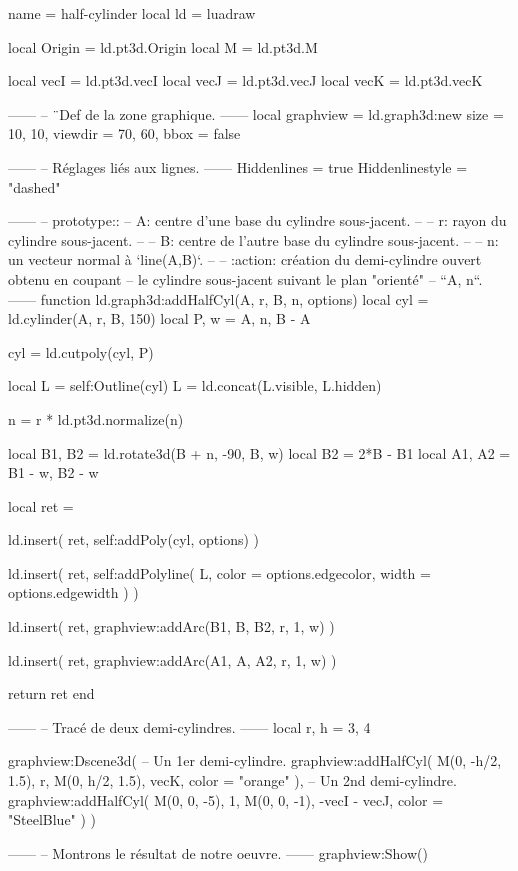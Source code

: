 \documentclass[border = 3pt]{standalone}
\begin{document}
\begin{luadraw*}{name = half-cylinder}
local ld = luadraw

local Origin = ld.pt3d.Origin
local M      = ld.pt3d.M

local vecI = ld.pt3d.vecI
local vecJ = ld.pt3d.vecJ
local vecK = ld.pt3d.vecK

------
-- ¨Def de la zone graphique.
------
local graphview = ld.graph3d:new{
  size    = {10, 10},
  viewdir = {70, 60},
  bbox    = false
}

------
-- Réglages liés aux lignes.
------
Hiddenlines     = true
Hiddenlinestyle = "dashed"

------
-- prototype::
--     A: centre d'une base du cylindre sous-jacent.
--
--     r: rayon du cylindre sous-jacent.
--
--     B: centre de l'autre base du cylindre sous-jacent.
--
--     n: un vecteur normal à `line(A,B)`.
--
--     :action: création du demi-cylindre ouvert obtenu en coupant
--         le cylindre sous-jacent suivant le plan "orienté"
--         ``{A, n}``.
------
function ld.graph3d:addHalfCyl(A, r, B, n, options)
  local cyl  = ld.cylinder(A, r, B, 150)
  local P, w = {A, n}, B - A

  cyl = ld.cutpoly(cyl, P)

  local L = self:Outline(cyl)
  L = ld.concat(L.visible, L.hidden)

  n = r * ld.pt3d.normalize(n)

  local B1, B2 = ld.rotate3d(B + n, -90, {B, w})
  local B2     = 2*B - B1
  local A1, A2 = B1 - w, B2 - w

  local ret = {}

  ld.insert(
    ret,
    self:addPoly(cyl, options)
  )

  ld.insert(
    ret,
    self:addPolyline(
      L,
      {
        color = options.edgecolor,
        width = options.edgewidth
      }
    )
  )

  ld.insert(
    ret,
    graphview:addArc(B1, B, B2, r, 1, w)
  )

  ld.insert(
    ret,
    graphview:addArc(A1, A, A2, r, 1, w)
  )

  return ret
end

------
-- Tracé de deux demi-cylindres.
------
local r, h = 3, 4

graphview:Dscene3d(
-- Un 1er demi-cylindre.
  graphview:addHalfCyl(
    M(0, -h/2, 1.5), r,
    M(0, h/2, 1.5), vecK,
    {color = "orange"}
  ),
-- Un 2nd demi-cylindre.
  graphview:addHalfCyl(
    M(0, 0, -5), 1,
    M(0, 0, -1), -vecI - vecJ,
    {color = "SteelBlue"}
  )
)

------
-- Montrons le résultat de notre oeuvre.
------
graphview:Show()
\end{luadraw*}
\end{document}
